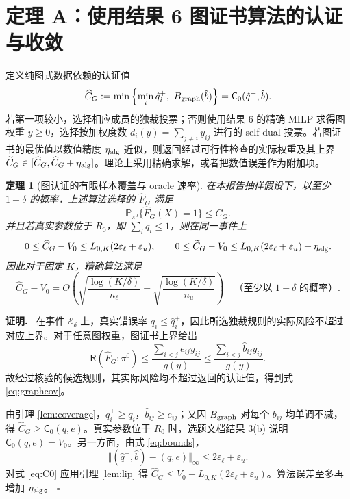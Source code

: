 \documentclass[11pt,a4paper]{ctexart}
\newtheorem{theorem}{定理}[section]
\theoremstyle{definition}
\newenvironment{proofcn}{\par\noindent\textbf{证明.}\ }{\hfill$\square$\par}
\newcommand{\Rsk}{\mathsf R}
\newcommand{\CGraph}{\mathsf C_0}
\newcommand{\Pp}{\mathbb P}
\newcommand{\epsl}{\varepsilon_{\ell}}
\newcommand{\epsu}{\varepsilon_u}
\newcommand{\hC}{\widehat C}
\begin{document}
\section{定理 A：使用结果 6 图证书算法的认证与收敛}
定义纯图式数据依赖的认证值
\begin{equation}\label{eq:graphcert}
\hC_G:=\min\left\{\min_i\hat q_i^+,\ B_{\rm graph}(\hat b)\right\}=\CGraph(\hat q^+,\hat b).
\end{equation}
若第一项较小，选择相应成员的独裁投票；否则使用结果 6 的精确 MILP 求得图权重 $y\ge0$，选择按加权度数 $d_i(y)=\sum_{j\ne i}y_{ij}$ 进行的 self-dual 投票。若图证书的最优值以数值精度 $\eta_{\rm alg}$ 近似，则返回经过可行性检查的实际权重及其上界 $\widetilde C_G\in[\hC_G,\hC_G+\eta_{\rm alg}]$。理论上采用精确求解，或者把数值误差作为附加项。

\begin{theorem}[图认证的有限样本覆盖与 oracle 速率]\label{thm:graph}
在本报告抽样假设下，以至少 $1-\delta$ 的概率，上述算法选择的 $\hat F_G$ 满足
\begin{equation}\label{eq:graphcov}
\Pp_{\pi^0}\{\hat F_G(X)=1\}\le\widetilde C_G.
\end{equation}
并且若真实参数位于 $R_0$，即 $\sum_iq_i\le1$，则在同一事件上
\begin{equation}\label{eq:graphgap}
0\le\hC_G-V_0\le L_{0,K}(2\epsl+\epsu),\qquad
0\le\widetilde C_G-V_0\le L_{0,K}(2\epsl+\epsu)+\eta_{\rm alg}.
\end{equation}
因此对于固定 $K$，精确算法满足
\[
\hC_G-V_0=O\!\left(\sqrt{\frac{\log(K/\delta)}{n_\ell}}+\sqrt{\frac{\log(K/\delta)}{n_u}}\right)
\quad\text{（至少以 $1-\delta$ 的概率）}.
\]
\end{theorem}
\begin{proofcn}
在事件 $\mathcal E_\delta$ 上，真实错误率 $q_i\le\hat q_i^+$，因此所选独裁规则的实际风险不超过对应上界。对于任意图权重，图证书上界给出
\[\Rsk(\hat F_G;\pi^0)\le\frac{\sum_{i<j}e_{ij}y_{ij}}{g(y)}\le\frac{\sum_{i<j}\hat b_{ij}y_{ij}}{g(y)}.\]
故经过核验的候选规则，其实际风险均不超过返回的认证值，得到式 \eqref{eq:graphcov}。

由引理 \ref{lem:coverage}，$\hat q_i^+\ge q_i$，$\hat b_{ij}\ge e_{ij}$；又因 $B_{\rm graph}$ 对每个 $b_{ij}$ 均单调不减，得 $\hC_G\ge\CGraph(q,e)$。真实参数位于 $R_0$ 时，选题文档结果 3(b) 说明 $\CGraph(q,e)=V_0$。另一方面，由式 \eqref{eq:bounds}，
\[
\Vert(\hat q^+,\hat b)-(q,e)\Vert_\infty\le2\epsl+\epsu.
\]
对式 \eqref{eq:C0} 应用引理 \ref{lem:lip} 得 $\hC_G\le V_0+L_{0,K}(2\epsl+\epsu)$。算法误差至多再增加 $\eta_{\rm alg}$。
\end{proofcn}
\end{document}
